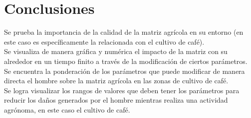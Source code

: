 \section{Conclusiones}
Se prueba la importancia de la calidad de la matriz agrícola en su entorno (en este caso es específicamente la relacionada con el cultivo de café).\\

Se visualiza de manera gráfica y numérica el impacto de la matriz con su alrededor en un tiempo finito a través de la modificación de ciertos parámetros.\\

Se encuentra la ponderación de los parámetros que puede modificar  de manera directa el hombre sobre la matriz agrícola en las zonas de cultivo de café.\\

Se logra visualizar los rangos de valores que deben tener los parámetros para reducir los daños generados por el hombre mientras realiza una actividad agrónoma,  en este caso el cultivo de café.

 \nocite{*}
